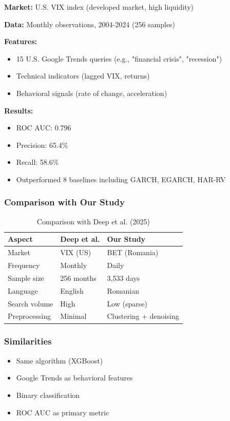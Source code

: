 \documentclass[12pt,a4paper]{article}
\begin{document}
\textbf{Market:} U.S. VIX index (developed market, high liquidity)

\textbf{Data:} Monthly observations, 2004-2024 (256 samples)

\textbf{Features:}
\begin{itemize}
    \item 15 U.S. Google Trends queries (e.g., "financial crisis", "recession")
    \item Technical indicators (lagged VIX, returns)
    \item Behavioral signals (rate of change, acceleration)
\end{itemize}

\textbf{Results:}
\begin{itemize}
    \item ROC AUC: 0.796
    \item Precision: 65.4\%
    \item Recall: 58.6\%
    \item Outperformed 8 baselines including GARCH, EGARCH, HAR-RV
\end{itemize}

\subsubsection{Comparison with Our Study}

\begin{table}[h]
\centering
\begin{tabular}{lll}
\hline
\textbf{Aspect} & \textbf{Deep et al.} & \textbf{Our Study} \\
\hline
Market & VIX (US) & BET (Romania) \\
Frequency & Monthly & Daily \\
Sample size & 256 months & 3,533 days \\
Language & English & Romanian \\
Search volume & High & Low (sparse) \\
Preprocessing & Minimal & Clustering + denoising \\
\hline
\end{tabular}
\caption{Comparison with Deep et al. (2025)}
\end{table}

\subsubsection{Similarities}
\begin{itemize}
    \item Same algorithm (XGBoost)
    \item Google Trends as behavioral features
    \item Binary classification
    \item ROC AUC as primary metric
\end{itemize}
\end{document}
